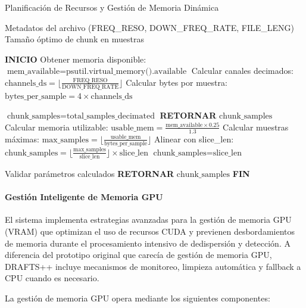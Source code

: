 \begin{algorithm}[H]
\caption{Planificación de Recursos y Gestión de Memoria Dinámica}
\label{alg:resource-planning}
\begin{algorithmic}[1]
\Require Metadatos del archivo (FREQ\_RESO, DOWN\_FREQ\_RATE, FILE\_LENG)
\Ensure Tamaño óptimo de chunk en muestras

\State \textbf{INICIO}
\State Obtener memoria disponible: $\text{mem\_available} = \text{psutil.virtual\_memory().available}$
\State Calcular canales decimados: $\text{channels\_ds} = \lfloor \frac{\text{FREQ\_RESO}}{\text{DOWN\_FREQ\_RATE}} \rfloor$
\State Calcular bytes por muestra: $\text{bytes\_per\_sample} = 4 \times \text{channels\_ds}$

    \State $\text{chunk\_samples} = \text{total\_samples\_decimated}$
    \State \textbf{RETORNAR} $\text{chunk\_samples}$
\Else
    \State Calcular memoria utilizable: $\text{usable\_mem} = \frac{\text{mem\_available} \times 0.25}{1.3}$
    \State Calcular muestras máximas: $\text{max\_samples} = \lfloor \frac{\text{usable\_mem}}{\text{bytes\_per\_sample}} \rfloor$
    \State Alinear con slice\_len: $\text{chunk\_samples} = \lfloor \frac{\text{max\_samples}}{\text{slice\_len}} \rfloor \times \text{slice\_len}$
        \State $\text{chunk\_samples} = \text{slice\_len}$ 
            \EndIf
\EndIf

\State Validar parámetros calculados
\State \textbf{RETORNAR} $\text{chunk\_samples}$
\State \textbf{FIN}
\end{algorithmic}
\end{algorithm}

\paragraph{Gestión Inteligente de Memoria GPU}

El sistema implementa estrategias avanzadas para la gestión de memoria GPU (VRAM) que optimizan el uso de recursos CUDA y previenen desbordamientos de memoria durante el procesamiento intensivo de dedispersión y detección. A diferencia del prototipo original que carecía de gestión de memoria GPU, DRAFTS++ incluye mecanismos de monitoreo, limpieza automática y fallback a CPU cuando es necesario.

La gestión de memoria GPU opera mediante los siguientes componentes:

